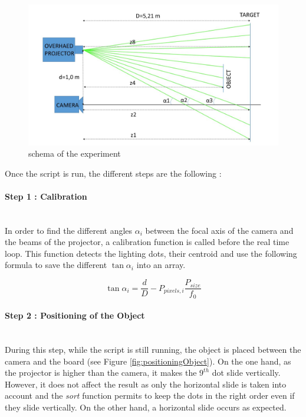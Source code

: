\begin{figure}[H]
  \centerline{\includegraphics[scale=0.4]{fig/expGridSchema.jpg}}
  \caption{schema of the experiment}
  \label{fig:expGridSchema}
\end{figure}


Once the script is run, the different steps are the following :
\paragraph*{Step 1 : Calibration}
~~\\
In order to find the different angles $\alpha_i$ between the focal axis of the camera and the beams of the projector, a calibration function is called before the real time loop. This function detects the lighting dots, their centroid and use the following formula to save the different $\tan \alpha_i$ into an array.

\begin{equation*}
\tan \alpha_i = \frac{d}{D}-P_{pixels,i}\frac{P_{size}}{f_0}
\end{equation*}


\paragraph*{Step 2 : Positioning of the Object}
~~\\
During this step, while the script is still running, the object is placed between the camera and the board (see Figure \ref{fig:positioningObject}). On the one hand, as the projector is higher than the camera, it makes the $9^{th}$ dot slide vertically. However, it does not affect the result as only the horizontal slide is taken into account and the \emph{sort} function permits to keep the dots in the right order even if they slide vertically. On the other hand, a horizontal slide occurs as expected.


